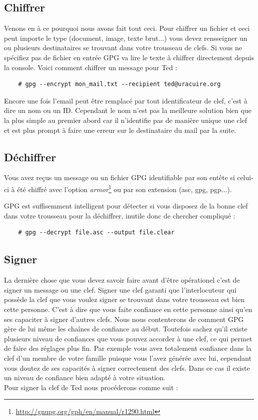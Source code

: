 \documentclass[a4paper]{article}
\begin{document}
\subsection{Chiffrer}
Venons en à ce pourquoi nous avons fait tout ceci. Pour chiffrer un fichier et
ceci peut importe le type (document, image, texte brut...) vous devez
rensseigner un ou plusieurs destinataires se trouvant dans votre trousseau de
clefs. Si vous ne spécifiez pas de fichier en entrée \textsc{GPG} va lire
le texte à chiffrer directement depuis la console. Voici comment chiffrer un
message pour Ted :
\begin{verbatim}
    # gpg --encrypt mon_mail.txt --recipient ted@uracuire.org
\end{verbatim}
Encore une fois l'email peut être remplacé par tout identificateur de clef,
c'est à dire un nom ou un ID. Cependant le nom n'est pas la meilleure solution
bien que la plus simple au premier abord car il n'identifie pas de manière
unique une clef et est plus prompt à faire une erreur sur le destinataire du
mail par la suite.

\subsection{Déchiffrer}
Vous avez reçus un message ou un fichier \textsc{GPG} identifiable par son entête
si celui-ci à été chiffré avec l'option \emph{armor}\protect\footnote{\url{http://gnupg.org/gph/en/manual/r1290.html}}
ou par son extension (asc, gpg, pgp...).

\textsc{GPG} est suffisemment intelligent pour détecter si vous disposez de la
bonne clef dans votre trousseau pour la déchiffrer, inutile donc de chercher
compliqué :

\begin{verbatim}
    # gpg --decrypt file.asc --output file.clear
\end{verbatim}

\subsection{Signer}
La dernière chose que vous devez savoir faire avant d'être opérationel c'est
de signer un message ou une clef. Signer une clef garanti que l'interlocuteur
qui possède la clef que vous voulez signer se trouvant dans votre trousseau est
bien cette personne. C'est à dire que vous faite confiance en cette personne
ainsi qu'en ses capaciter à signer d'autres clefs. Nous nous contenterons de
comment \textsc{GPG} gère de lui même les chaînes de confiance au début. Toutefois
sachez qu'il existe plusieurs niveau de confiances que vous pouvez accorder à une
clef, ce qui permet de faire des réglages plus fin. Par exemple vous avez
totalement confiance dans la clef d'un membre de votre famille puisque vous
l'avez générée avec lui, cependant vous doutez de ses capacités à signer
correctement des clefs. Dans ce cas il existe un niveau de confiance bien adapté
à votre situation.
\\
Pour signer la clef de Ted nous procéderons comme suit :
\end{document}
